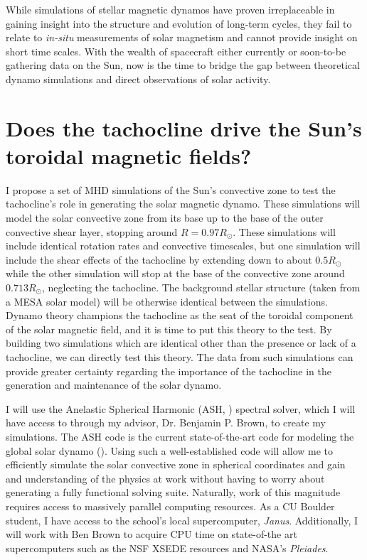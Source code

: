 \documentclass[aasms,12pt]{article}
\begin{document}
While simulations of stellar magnetic dynamos have proven
irreplaceable in gaining insight into the structure and evolution of 
long-term cycles, they fail to relate to \emph{in-situ} measurements
of solar magnetism and cannot provide insight on short time scales.
With the wealth of spacecraft either currently or soon-to-be 
gathering data on the Sun, now is the time to bridge the gap between 
theoretical dynamo simulations and direct observations of solar activity.


\section{Does the tachocline drive the Sun's toroidal magnetic fields?}
I propose a set of MHD simulations of the Sun's convective zone
to test the tachocline's role in generating the solar magnetic 
dynamo.  These simulations will model the solar convective
zone from its base up to the base of the outer convective shear layer, stopping
around $R = 0.97R_{\odot}$.  These simulations will include identical rotation
rates and convective timescales, but one simulation will include the shear
effects of the tachocline by extending down to about $0.5R_{\odot}$
while the other simulation will stop at the base of the convective zone
around $0.713R_{\odot}$, neglecting the tachocline.  
The background stellar structure (taken from a MESA solar model) will be 
otherwise identical between the simulations.
Dynamo theory champions the tachocline as the seat of the toroidal component
of the solar magnetic field, and it is time to put this theory to the test.
By building two simulations which are identical other than the presence or lack
of a tachocline, we can directly test this theory.  The data from such
simulations can provide greater certainty regarding the importance
of the tachocline in the generation and maintenance of the solar dynamo.

I will use the Anelastic Spherical Harmonic (ASH, 
\citealt{Clune1999}) spectral solver, which I will have access to through my
advisor, Dr. Benjamin P. Brown, to create my simulations.  The ASH code is the
current state-of-the-art code for modeling the global solar dynamo
(\citealt{Toomre2009, Brun2011, Alvan2014}). Using such a 
well-established code will allow me to
efficiently simulate the solar convective zone in spherical coordinates and gain
and understanding of the physics at work without having to
worry about generating a fully functional solving suite.  
Naturally, work
of this magnitude requires access to massively parallel computing resources.
As a CU Boulder student, I have access to the school's local supercomputer,
\emph{Janus}.  Additionally, I will work with Ben Brown to acquire CPU time on
state-of-the art supercomputers such as the NSF XSEDE resources and NASA's
\emph{Pleiades}. 
\end{document}
